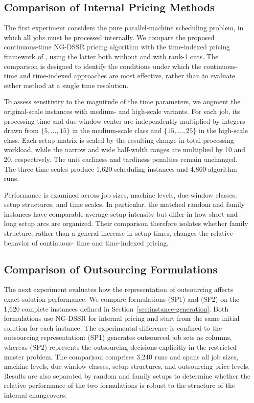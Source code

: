 \subsection{Comparison of Internal Pricing Methods}\label{sec:pricing-comparison}

The first experiment considers the pure parallel-machine scheduling problem, in which
all jobs must be processed internally. We compare the proposed continuous-time
NG-DSSR pricing algorithm with the time-indexed pricing framework of
\citet{bulhoes2020exact}, using the latter both without and with rank-1 cuts. The
comparison is designed to identify the conditions under which the continuous-time and
time-indexed approaches are most effective, rather than to evaluate either method at
a single time resolution.

To assess sensitivity to the magnitude of the time parameters, we augment the
original-scale instances with medium- and high-scale variants. For each job, its
processing time and due-window center are independently multiplied by integers drawn
from $\{5,\ldots,15\}$ in the medium-scale class and $\{15,\ldots,25\}$ in the
high-scale class. Each setup matrix is scaled by the resulting change in total
processing workload, while the narrow and wide half-width ranges are multiplied by
10 and 20, respectively. The unit earliness and tardiness penalties remain unchanged.
The three time scales produce 1,620 scheduling instances and 4,860 algorithm runs.

Performance is examined across job sizes, machine levels, due-window classes, setup
structures, and time scales. In particular, the matched random and family instances
have comparable average setup intensity but differ in how short and long setup arcs
are organized. Their comparison therefore isolates whether family structure, rather
than a general increase in setup times, changes the relative behavior of continuous-
time and time-indexed pricing.

\subsection{Comparison of Outsourcing Formulations}\label{sec:outsourcing-formulation-comparison}

The next experiment evaluates how the representation of outsourcing affects exact
solution performance. We compare formulations \textup{(SP1)} and \textup{(SP2)} on
the 1,620 complete instances defined in Section~\ref{sec:instance-generation}. Both
formulations use NG-DSSR for internal pricing and start from the same initial solution
for each instance. The experimental difference is confined to the outsourcing
representation: \textup{(SP1)} generates outsourced job sets as columns, whereas
\textup{(SP2)} represents the outsourcing decisions explicitly in the restricted
master problem. The comparison comprises 3,240 runs and spans all job sizes, machine
levels, due-window classes, setup structures, and outsourcing price levels. Results
are also separated by random and family setups to determine whether the relative
performance of the two formulations is robust to the structure of the internal
changeovers.

